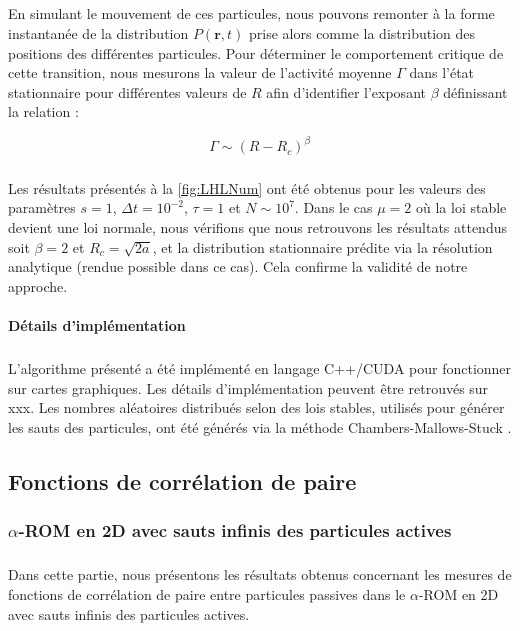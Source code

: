 \subparagraph{}En simulant le mouvement de ces particules, nous pouvons remonter à la forme instantanée de la distribution $P(\mathbf{r},t)$ prise alors comme la distribution des positions des différentes particules. Pour déterminer le comportement critique de cette transition, nous mesurons la valeur de l'activité moyenne $\Gamma$ dans l'état stationnaire pour différentes valeurs de $R$ afin d'identifier l'exposant $\beta$ définissant la relation :

\begin{equation}
	\Gamma \sim (R-R_c)^\beta
\end{equation}

\subparagraph{} Les résultats présentés à la \autoref{fig:LHLNum} ont été obtenus pour les valeurs des paramètres $s=1$, $\Delta t  = 10^{-2}$, $\tau = 1$ et $N \sim 10^7$. Dans le cas $\mu = 2$ où la loi stable devient une loi normale, nous vérifions que nous retrouvons les résultats attendus soit $\beta = 2$ et $R_c = \sqrt{2a}$, et la distribution stationnaire  prédite via la résolution analytique (rendue possible dans ce cas). Cela confirme la validité de notre approche.

\paragraph{Détails d'implémentation}

\subparagraph{}L'algorithme présenté a été implémenté en langage C++/CUDA pour fonctionner sur cartes graphiques. Les détails d'implémentation peuvent être retrouvés sur xxx. Les nombres aléatoires distribués selon des lois stables, utilisés pour générer les sauts des particules, ont été générés via la méthode Chambers-Mallows-Stuck \cite{chambers_method_1976, weron_chambers_mallows_stuck_1996}.

\subsection{Fonctions de corrélation de paire}

\label{sec:PCorr}

\subsubsection{$\alpha$-ROM en 2D avec sauts infinis des particules actives}

\subparagraph{}Dans cette partie, nous présentons les résultats obtenus concernant les mesures de fonctions de corrélation de paire entre particules passives dans le $\alpha$-ROM en 2D avec sauts infinis des particules actives.

